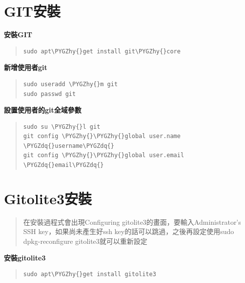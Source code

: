 \documentclass[letterpaper,10pt,english]{sphinxmanual}
\def\PYGZhy{\char`\-}
\def\PYGZdq{\char`\"}
\begin{document}
\section{GIT安裝}
\label{_doc/git/index:id1}
\textbf{安裝GIT}
\begin{quote}

\begin{Verbatim}[commandchars=\\\{\}]
sudo apt\PYGZhy{}get install git\PYGZhy{}core
\end{Verbatim}
\end{quote}

\textbf{新增使用者git}
\begin{quote}

\begin{Verbatim}[commandchars=\\\{\}]
sudo useradd \PYGZhy{}m git
sudo passwd git
\end{Verbatim}
\end{quote}

\textbf{設置使用者的git全域參數}
\begin{quote}

\begin{Verbatim}[commandchars=\\\{\}]
sudo su \PYGZhy{}l git
git config \PYGZhy{}\PYGZhy{}global user.name \PYGZdq{}username\PYGZdq{}
git config \PYGZhy{}\PYGZhy{}global user.email \PYGZdq{}email\PYGZdq{}
\end{Verbatim}
\end{quote}


\section{Gitolite3安裝}
\label{_doc/git/index:gitolite3}\begin{quote}

在安裝過程式會出現Configuring gitolite3的畫面，要輸入Administrator's SSH key，如果尚未產生好ssh key的話可以跳過，之後再設定使用sudo dpkg-reconfigure gitolite3就可以重新設定
\end{quote}

\textbf{安裝gitolite3}
\begin{quote}

\begin{Verbatim}[commandchars=\\\{\}]
sudo apt\PYGZhy{}get install gitolite3
\end{Verbatim}
\end{quote}
\end{document}
